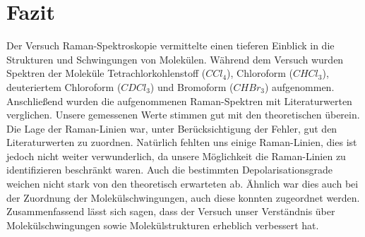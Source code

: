 \chapter{Fazit}
Der Versuch Raman-Spektroskopie vermittelte einen tieferen Einblick in die 
Strukturen und Schwingungen von Molekülen. 
Während dem Versuch wurden Spektren der Moleküle 
Tetrachlorkohlenstoff ($CCl_4$), Chloroform ($CHCl_3$), deuteriertem Chloroform ($CDCl_3$) 
und Bromoform ($CHBr_3$) aufgenommen.
Anschließend wurden die aufgenommenen Raman-Spektren mit Literaturwerten verglichen.
Unsere gemessenen Werte stimmen gut mit den theoretischen überein.
Die Lage der Raman-Linien war, unter Berücksichtigung der Fehler, gut den 
Literaturwerten zu zuordnen. Natürlich fehlten uns einige Raman-Linien, dies ist jedoch nicht weiter 
verwunderlich, da unsere Möglichkeit die Raman-Linien zu identifizieren 
beschränkt waren. Auch die bestimmten 
Depolarisationsgrade weichen nicht stark von den theoretisch erwarteten ab.
Ähnlich war dies auch bei der Zuordnung der Molekülschwingungen, auch diese 
konnten zugeordnet werden. \\

Zusammenfassend lässt sich sagen, dass der Versuch unser Verständnis über
Molekülschwingungen sowie Molekülstrukturen erheblich verbessert hat.
 
